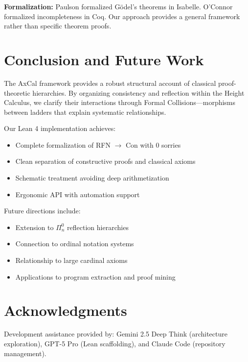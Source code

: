 \documentclass[11pt]{article}
\begin{document}
\textbf{Formalization:} Paulson \cite{Paulson2014} formalized Gödel's theorems in Isabelle. O'Connor \cite{OConnor2005} formalized incompleteness in Coq. Our approach provides a general framework rather than specific theorem proofs.

\section{Conclusion and Future Work}

The AxCal framework provides a robust structural account of classical proof-theoretic hierarchies. By organizing consistency and reflection within the Height Calculus, we clarify their interactions through Formal Collisions—morphisms between ladders that explain systematic relationships.

Our Lean 4 implementation achieves:
\begin{itemize}
\item Complete formalization of RFN $\to$ Con with 0 sorries
\item Clean separation of constructive proofs and classical axioms
\item Schematic treatment avoiding deep arithmetization
\item Ergonomic API with automation support
\end{itemize}

Future directions include:
\begin{itemize}
\item Extension to $\Pi^0_n$ reflection hierarchies
\item Connection to ordinal notation systems
\item Relationship to large cardinal axioms
\item Applications to program extraction and proof mining
\end{itemize}

\section*{Acknowledgments}

Development assistance provided by: Gemini 2.5 Deep Think (architecture exploration), GPT-5 Pro (Lean scaffolding), and Claude Code (repository management).
\end{document}
